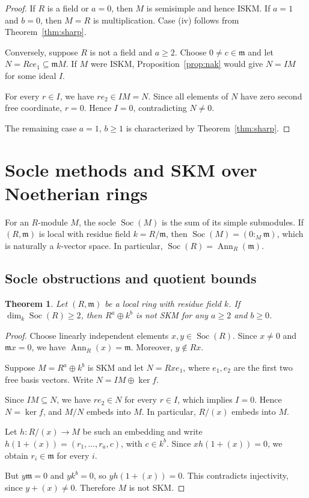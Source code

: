 \documentclass[11pt,a4paper]{article}
\newtheorem{theorem}{Theorem}[section]
\theoremstyle{definition}
\theoremstyle{remark}
\begin{document}
\begin{proof}
If $R$ is a field or $a=0$, then $M$ is semisimple and hence ISKM. If $a=1$ and $b=0$, then $M=R$ is multiplication. Case (iv) follows from Theorem~\ref{thm:sharp}.

Conversely, suppose $R$ is not a field and $a\geq2$. Choose $0\ne c\in\mathfrak m$ and let $N=Rce_1\subseteq\mathfrak m M$. If $M$ were ISKM, Proposition~\ref{prop:nak} would give $N=IM$ for some ideal $I$.

For every $r\in I$, we have $re_2\in IM=N$. Since all elements of $N$ have zero second free coordinate, $r=0$. Hence $I=0$, contradicting $N\ne0$.

The remaining case $a=1$, $b\geq1$ is characterized by Theorem~\ref{thm:sharp}.
\end{proof}


\section{Socle methods and SKM over Noetherian rings}

For an $R$-module $M$, the socle $\operatorname{Soc}(M)$ is the sum of its simple submodules. If $(R,\mathfrak m)$ is local with residue field $k=R/\mathfrak m$, then $\operatorname{Soc}(M)=(0:_M\mathfrak m)$, which is naturally a $k$-vector space. In particular, $\operatorname{Soc}(R)=\operatorname{Ann}_R(\mathfrak m)$.

\subsection{Socle obstructions and quotient bounds}

\begin{theorem} 
\label{thm:socle}
Let $(R,\mathfrak m)$ be a local ring with residue field $k$. If $\dim_k\operatorname{Soc}(R)\geq2$, then $R^a\oplus k^b$ is not SKM for any $a\geq2$ and $b\geq0$.
\end{theorem}

\begin{proof}
Choose linearly independent elements $x,y\in\operatorname{Soc}(R)$. Since $x\ne0$ and $\mathfrak m x=0$, we have $\operatorname{Ann}_R(x)=\mathfrak m$. Moreover, $y\notin Rx$.

Suppose $M=R^a\oplus k^b$ is SKM and let $N=Rxe_1$, where $e_1,e_2$ are the first two free basis vectors. Write $N=IM\oplus\ker f$.

Since $IM\subseteq N$, we have $re_2\in N$ for every $r\in I$, which implies $I=0$. Hence $N=\ker f$, and $M/N$ embeds into $M.$ In particular, $R/(x)$ embeds into $M$.

Let $h:R/(x)\to M$ be such an embedding and write $h(1+(x))=(r_1,\ldots,r_a,c)$, with $c\in k^b$. Since $xh(1+(x))=0$, we obtain $r_i\in\mathfrak m$ for every $i$.

But $y\mathfrak m=0$ and $yk^b=0$, so $yh(1+(x))=0$. This contradicts injectivity, since $y+(x)\ne0$. Therefore $M$ is not SKM.
\end{proof}
\end{document}
